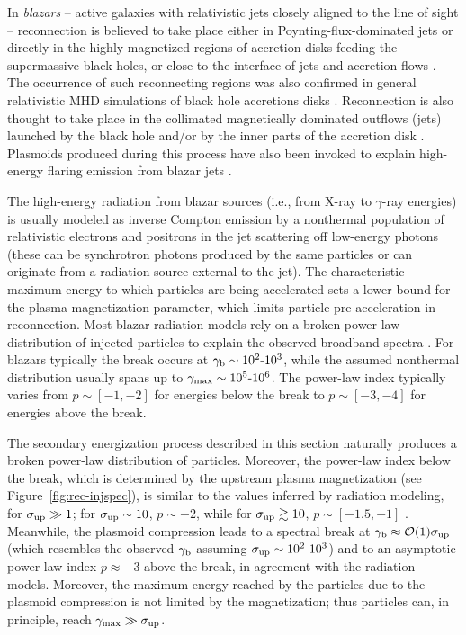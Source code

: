 In {\it blazars} -- active galaxies with relativistic jets closely aligned to the line of sight -- reconnection is believed to take place either in Poynting-flux-dominated jets \citep[e.g.,][]{2019MNRAS.484.1378G} or directly in the highly magnetized regions of accretion disks feeding the supermassive black holes, or close to the interface of jets and accretion flows \citep[e.g.,][]{2010A&A...518A...5D}. The occurrence of such reconnecting regions was also confirmed in general relativistic MHD simulations of black hole accretions disks \citep{2020MNRAS.495.1549N, 2020ApJ...900..100R}. Reconnection is also thought to take place in the collimated magnetically dominated outflows (jets) launched by the black hole and/or by the inner parts of the accretion disk \citep{2006A&A...450..887G, 2017MNRAS.469.4957B, 2018MNRAS.474.3535G}. Plasmoids produced during this process have also been invoked to explain high-energy flaring emission from blazar jets \citep[e.g.,][]{2013MNRAS.431..355G, 2016MNRAS.462.3325P, 2019MNRAS.482...65C}.

The high-energy radiation from blazar sources (i.e., from X-ray to $\gamma$-ray energies)  is usually modeled as inverse Compton emission by a nonthermal population of relativistic electrons and positrons in the jet scattering off low-energy photons (these can be synchrotron photons produced by the same particles or can originate from a radiation source external to the jet). The characteristic maximum energy to which particles are being accelerated sets a lower bound for the plasma magnetization parameter, which limits particle pre-acceleration in reconnection. Most blazar radiation models rely on a broken power-law distribution of injected particles to explain the observed broadband spectra \citep[e.g.,][]{2008MNRAS.385..283C, 2010MNRAS.401.1570T, 2013ApJ...768...54B}. For blazars typically the break occurs at $\gamma_{\rm b}\sim 10^2\text{-}10^3$, while the assumed nonthermal distribution usually spans up to $\gamma_{\rm max}\sim 10^5\text{-}10^6$. The power-law index typically varies from $p\sim [-1,-2]$ for energies below the break to $p\sim [-3,-4]$ for energies above the break. 

The secondary energization process described in this section naturally produces a broken power-law distribution of particles. Moreover, the power-law index below the break, which is determined by the upstream plasma magnetization (see Figure~\ref{fig:rec-injspec}), is similar to the values inferred by radiation modeling, for $\sigma_{\rm up} \gg 1$; for $\sigma_{\rm up} \sim 10$, $p\sim -2$, while for $\sigma_{\rm up} \gtrsim 10$, $p\sim [-1.5,-1]$ \citep[e.g.,][]{2014PhRvL.113o5005G, 2014ApJ...783L..21S,  2016ApJ...816L...8W}. Meanwhile, the plasmoid compression leads to a spectral break at $\gamma_{\rm b} \approx \mathcal{O}(1)\sigma_{\rm up}$ (which resembles the observed $\gamma_{\rm b}$ assuming $\sigma_{\rm up}\sim 10^2\text{-}10^3$) and to an asymptotic power-law index $p\approx -3$ above the break, in agreement with the radiation models. Moreover, the maximum energy reached by the particles due to the plasmoid compression is not limited by the magnetization; thus particles can, in principle, reach $\gamma_{\max} \gg \sigma_{\rm up}$.

